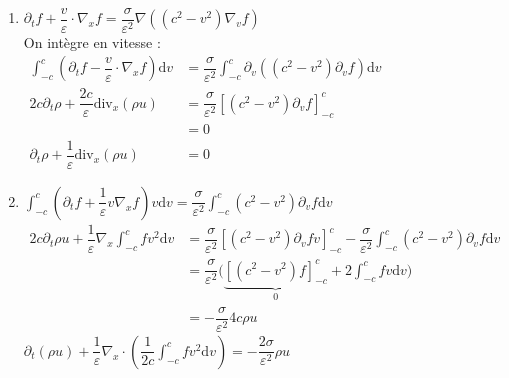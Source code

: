 \documentclass[12pt,a4paper]{article}
\begin{document}
	\begin{sol}$ $
		\begin{enumerate}
			\item \begin{minipage}[t]{18.5cm}
				$\partial_t f + \dfrac v\varepsilon
			 \cdot\nabla_x f = \dfrac\sigma{\varepsilon^2} \nabla\left((c^2 - v^2)\nabla_vf\right)$\\
			On intègre en vitesse :\\
			
			$\begin{aligned}
				\displaystyle\int_{-c}^c (\partial_t f - \dfrac v\varepsilon\cdot\nabla_x f)\mathrm dv &= \dfrac\sigma{\varepsilon^2}\int_{-c}^c \partial_v \left((c^2-v^2)\partial_v f\right)\mathrm dv\\
				2c\partial_t\rho + \dfrac{2c}\varepsilon\mathrm{div}_x(\rho u) &= \dfrac{\sigma}{\varepsilon^2}\left[(c^2-v^2)\partial_v f\right]_{-c}^c\\
				&= 0\\
				\partial_t \rho + \dfrac1\varepsilon \mathrm{div}_x(\rho u) &= 0
			\end{aligned}$
		\end{minipage}
		
		\item \begin{minipage}[t]{18cm}
			$\displaystyle\int_{-c}^c \left(\partial_t f + \dfrac1\varepsilon v \nabla_x f\right)v\mathrm dv = \dfrac\sigma{\varepsilon^2}\int_ {-c}^c (c^2-v^2)\partial_v f \mathrm dv$\\
			$\begin{aligned}
				2c\partial_t\rho u + \dfrac1\varepsilon\nabla_x\displaystyle\int_{-c}^c fv^2\mathrm dv &= \dfrac\sigma{\varepsilon^2}\left[(c^2-v^2)\partial_v f v\right]_{-c}^c-\dfrac\sigma{\varepsilon^2} \int_{-c}^c (c^2-v^2)\partial_v f\mathrm dv\\
				&= \dfrac\sigma{\varepsilon^2}\Big(\underbrace{\left[(c^2-v^2)f\right]_{-c}^c}_0+2\int_{-c}^c fv \mathrm dv\Big) \\
				& = -\dfrac\sigma{\varepsilon^2}4c\rho u
			\end{aligned}$\\
			
			$\displaystyle\partial_t(\rho u) + \dfrac1\varepsilon\nabla_x\cdot\left(\dfrac1{2c}\int_{-c}^c fv^2\mathrm dv\right) = -\dfrac{2\sigma}{\varepsilon^2}\rho u$
		\end{minipage}
		
		\newpage
		

\end{enumerate}
\end{sol}
\end{document}
